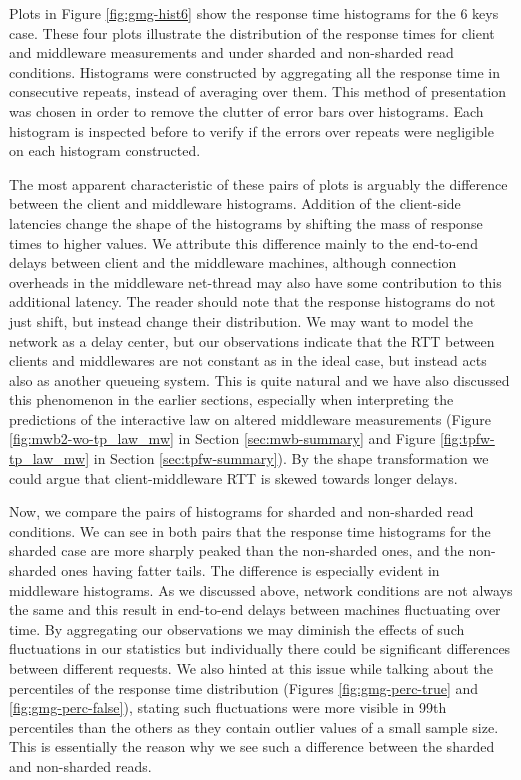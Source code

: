 \documentclass[11pt,a4paper]{article}
\begin{document}
Plots in Figure \ref{fig:gmg-hist6} show the response time histograms for the 6 keys case. These four plots illustrate the distribution of the response times for client and middleware measurements and under sharded and non-sharded read conditions. Histograms were constructed by aggregating all the response time in consecutive repeats, instead of averaging over them. This method of presentation was chosen in order to remove the clutter of error bars over histograms. Each histogram is inspected before to verify if the errors over repeats were negligible on each histogram constructed.
\par The most apparent characteristic of these pairs of plots is arguably the difference between the client and middleware histograms. Addition of the client-side latencies change the shape of the histograms by shifting the mass of response times to higher values. We attribute this difference mainly to the end-to-end delays between client and the middleware machines, although connection overheads in the middleware net-thread may also have some contribution to this additional latency. The reader should note that the response histograms do not just shift, but instead change their distribution. We may want to model the network as a delay center, but our observations indicate that the RTT between clients and middlewares are not constant as in the ideal case, but instead acts also as another queueing system. This is quite natural and we have also discussed this phenomenon in the earlier sections, especially when interpreting the predictions of the interactive law on altered middleware measurements (Figure \ref{fig:mwb2-wo-tp_law_mw} in Section \ref{sec:mwb-summary} and Figure \ref{fig:tpfw-tp_law_mw} in Section \ref{sec:tpfw-summary}). By the shape transformation we could argue that client-middleware RTT is skewed towards longer delays.
\\
\par Now, we compare the pairs of histograms for sharded and non-sharded read conditions. We can see in both pairs that the response time histograms for the sharded case are more sharply peaked than the non-sharded ones, and the non-sharded ones having fatter tails. The difference is especially evident in middleware histograms. As we discussed above, network conditions are not always the same and this result in end-to-end delays between machines fluctuating over time. By aggregating our observations we may diminish the effects of such fluctuations in our statistics but individually there could be significant differences between different requests. We also hinted at this issue while talking about the percentiles of the response time distribution (Figures \ref{fig:gmg-perc-true} and \ref{fig:gmg-perc-false}), stating such fluctuations were more visible in 99th percentiles than the others as they contain outlier values of a small sample size. This is essentially the reason why we see such a difference between the sharded and non-sharded reads.
\end{document}
